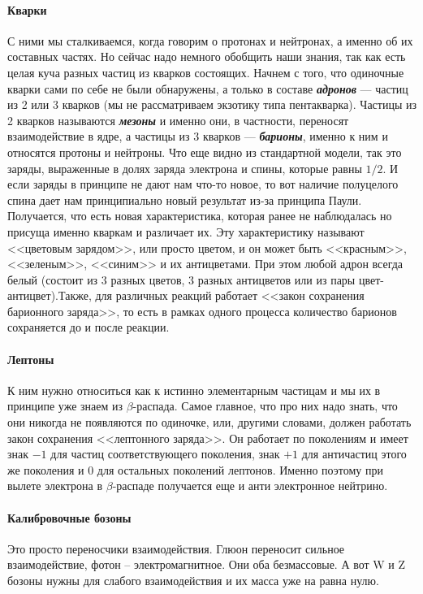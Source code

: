 \documentclass[12pt]{article}
\begin{document}
\paragraph{Кварки} 
С ними мы сталкиваемся, когда говорим о протонах и нейтронах, а именно об их составных частях. Но сейчас надо немного обобщить наши знания, так как есть целая куча разных частиц из кварков состоящих. Начнем с того, что одиночные  кварки сами по себе не были обнаружены, а только в составе \textbf{\textit{адронов}} --- частиц из 2 или 3 кварков (мы не рассматриваем экзотику типа пентакварка). Частицы из 2 кварков называются \textit{\textbf{мезоны}} и именно они, в частности, переносят взаимодействие в ядре, а частицы из 3 кварков --- \textit{\textbf{барионы}}, именно к ним и относятся протоны и нейтроны. Что еще видно из стандартной модели, так это заряды, выраженные в долях заряда электрона и спины, которые равны $1/2$. И если заряды в принципе не дают нам что-то новое, то вот наличие полуцелого спина дает нам принципиально новый результат из-за принципа Паули. Получается, что есть новая характеристика, которая ранее не наблюдалась но присуща именно кваркам и различает их. Эту характеристику называют <<цветовым зарядом>>, или просто цветом, и он может быть <<красным>>, <<зеленым>>, <<синим>> и их антицветами. При этом любой адрон всегда белый (состоит из 3 разных цветов, 3 разных антицветов или из пары цвет-антицвет).Также, для различных реакций работает <<закон сохранения барионного заряда>>, то есть в рамках одного процесса количество барионов сохраняется до и после реакции.
\paragraph{Лептоны}
К ним нужно относиться как к истинно элементарным частицам и мы их в принципе уже знаем из $\beta$-распада. Самое главное, что про них надо знать, что они никогда не появляются по одиночке, или, другими словами, должен работать закон сохранения <<лептонного заряда>>. Он работает по поколениям и имеет знак $-1$ для частиц соответствующего поколения, знак $+1$ для античастиц этого же поколения и $0$ для остальных поколений лептонов. Именно поэтому при вылете электрона в $\beta$-распаде получается еще и анти электронное нейтрино.
\paragraph{Калибровочные бозоны}
Это просто переносчики взаимодействия. Глюон переносит сильное взаимодействие, фотон -- электромагнитное. Они оба безмассовые. А вот W и Z бозоны нужны для слабого взаимодействия и их масса уже на равна нулю.
\end{document}
